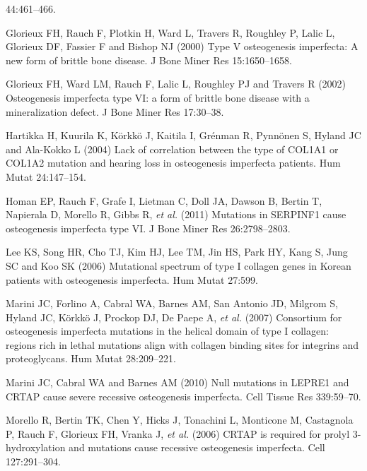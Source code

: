                     44:461–466.
\par Glorieux FH, Rauch F, Plotkin H, Ward L, Travers R, Roughley P,
                    Lalic L, Glorieux DF, Fassier F and Bishop NJ (2000) Type V osteogenesis
                    imperfecta: A new form of brittle bone disease. J Bone Miner Res
                    15:1650–1658.
\par Glorieux FH, Ward LM, Rauch F, Lalic L, Roughley PJ and Travers R
                    (2002) Osteogenesis imperfecta type VI: a form of brittle bone disease with a
                    mineralization defect. J Bone Miner Res 17:30–38.
\par Hartikka H, Kuurila K, Körkkö J, Kaitila I, Grénman R, Pynnönen S,
                    Hyland JC and Ala-Kokko L (2004) Lack of correlation between the type of COL1A1
                    or COL1A2 mutation and hearing loss in osteogenesis imperfecta patients. Hum
                    Mutat 24:147–154.
\par Homan EP, Rauch F, Grafe I, Lietman C, Doll JA, Dawson B, Bertin T,
                    Napierala D, Morello R, Gibbs R, \textit{et al.} (2011) Mutations in
                    SERPINF1 cause osteogenesis imperfecta type VI. J Bone Miner Res
                    26:2798–2803.
\par Lee KS, Song HR, Cho TJ, Kim HJ, Lee TM, Jin HS, Park HY, Kang S,
                    Jung SC and Koo SK (2006) Mutational spectrum of type I collagen genes in Korean
                    patients with osteogenesis imperfecta. Hum Mutat 27:599.
\par Marini JC, Forlino A, Cabral WA, Barnes AM, San Antonio JD, Milgrom
                    S, Hyland JC, Körkkö J, Prockop DJ, De Paepe A, \textit{et al.} (2007)
                    Consortium for osteogenesis imperfecta mutations in the helical domain of type I
                    collagen: regions rich in lethal mutations align with collagen binding sites for
                    integrins and proteoglycans. Hum Mutat 28:209–221.
\par Marini JC, Cabral WA and Barnes AM (2010) Null mutations in LEPRE1
                    and CRTAP cause severe recessive osteogenesis imperfecta. Cell Tissue Res
                    339:59–70.
\par Morello R, Bertin TK, Chen Y, Hicks J, Tonachini L, Monticone M,
                    Castagnola P, Rauch F, Glorieux FH, Vranka J, \textit{et al.} (2006)
                    CRTAP is required for prolyl 3- hydroxylation and mutations cause recessive
                    osteogenesis imperfecta. Cell 127:291–304.
